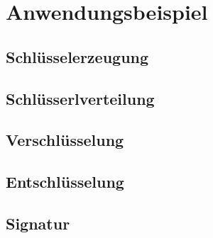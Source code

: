 \chapter{Anwendungsbeispiel}

\section{Schlüsselerzeugung}
\newpage
\section{Schlüsserlverteilung}
\newpage
\section{Verschlüsselung}
\newpage
\section{Entschlüsselung}
\newpage
\section{Signatur}

